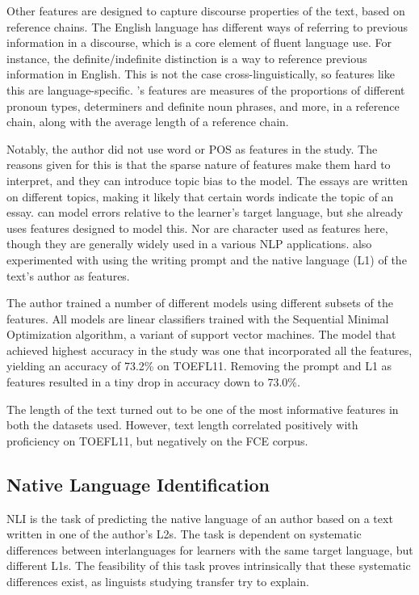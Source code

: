 Other features are designed to capture discourse properties of the text,
based on reference chains. The English language has different ways of
referring to previous information in a discourse, which is a core element of
fluent language use. For instance, the definite/indefinite distinction is a
way to reference previous information in English. This is not the case
cross-linguistically, so features like this are language-specific.
\citeauthor{vajjala17}'s features are measures of the proportions of
different pronoun types, determiners and definite noun phrases, and more, in
a reference chain, along with the average length of a reference chain.

Notably, the author did not use word or \ac{POS} \ngrams as features in the
study. The reasons given for this is that the sparse nature of \ngram
features make them hard to interpret, and they can introduce topic bias to
the model. The essays are written on different topics, making it likely that
certain words indicate the topic of an essay. \ngrams can model errors
relative to the learner's target language, but she already uses features
designed to model this. Nor are character \ngrams used as features here,
though they are generally widely used in a various NLP applications.
\citeauthor{vajjala17} also experimented with using the writing prompt and
the native language (L1) of the text's author as features.

The author trained a number of different models using different subsets of
the features. All models are linear classifiers trained with the Sequential
Minimal Optimization algorithm, a variant of support vector machines. The
model that achieved highest accuracy in the study was one that incorporated
all the features, yielding an accuracy of 73.2\% on TOEFL11. Removing the
prompt and L1 as features resulted in a tiny drop in accuracy down to
73.0\%.

The length of the text turned out to be one of the most informative features
in both the datasets used. However, text length correlated positively with
proficiency on TOEFL11, but negatively on the FCE corpus.


\subsection{Native Language Identification}

\ac{NLI} is the task of predicting the native language of an author based on
a text written in one of the author's \acp{L2}. The task is
dependent on systematic differences between interlanguages for learners with
the same target language, but different L1s. The feasibility of this task
proves intrinsically that these systematic differences exist, as linguists
studying transfer try to explain.


